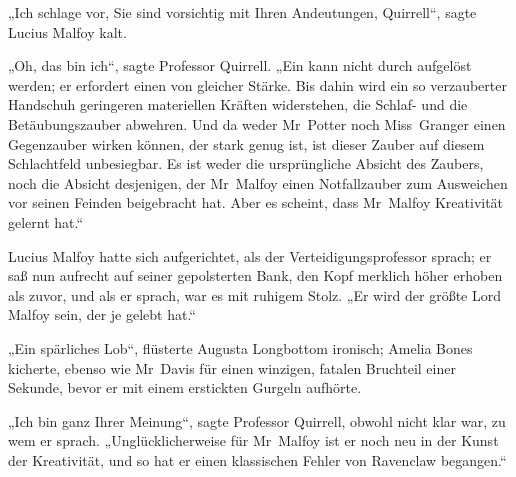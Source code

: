 „Ich schlage vor, Sie sind vorsichtig mit Ihren Andeutungen, Quirrell“, sagte Lucius Malfoy kalt.

„Oh, das bin ich“, sagte Professor Quirrell. „Ein  kann nicht durch  aufgelöst werden; er erfordert einen  von gleicher Stärke. Bis dahin wird ein so verzauberter Handschuh geringeren materiellen Kräften widerstehen, die Schlaf- und die Betäubungszauber abwehren. Und da weder Mr~Potter noch Miss~Granger einen Gegenzauber wirken können, der stark genug ist, ist dieser Zauber auf diesem Schlachtfeld unbesiegbar. Es ist weder die ursprüngliche Absicht des Zaubers, noch die Absicht desjenigen, der Mr~Malfoy einen Notfallzauber zum Ausweichen vor seinen Feinden beigebracht hat. Aber es scheint, dass Mr~Malfoy Kreativität gelernt hat.“

Lucius Malfoy hatte sich aufgerichtet, als der Verteidigungsprofessor sprach; er saß nun aufrecht auf seiner gepolsterten Bank, den Kopf merklich höher erhoben als zuvor, und als er sprach, war es mit ruhigem Stolz. „Er wird der größte Lord Malfoy sein, der je gelebt hat.“

„Ein spärliches Lob“, flüsterte Augusta Longbottom ironisch; Amelia Bones kicherte, ebenso wie Mr~Davis für einen winzigen, fatalen Bruchteil einer Sekunde, bevor er mit einem erstickten Gurgeln aufhörte.

„Ich bin ganz Ihrer Meinung“, sagte Professor Quirrell, obwohl nicht klar war, zu wem er sprach. „Unglücklicherweise für Mr~Malfoy ist er noch neu in der Kunst der Kreativität, und so hat er einen klassischen Fehler von Ravenclaw begangen.“

